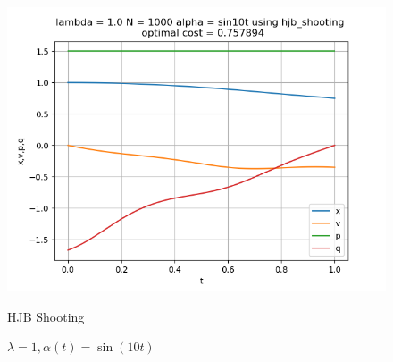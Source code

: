 \begin{figure}[H]
\begin{minipage}{0.3\textwidth}
		\includegraphics[width=\linewidth]{hjb_shooting_l1_alphasin.png}
		\caption{HJB Shooting}
	\end{minipage}
	\caption{$\lambda = 1, \alpha(t) = \sin(10 t)$}
\end{figure}

